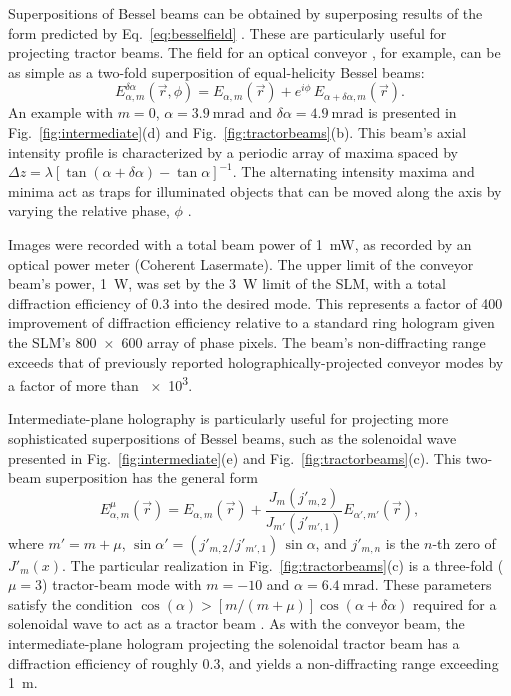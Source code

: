 Superpositions of Bessel beams can be obtained
by superposing results of the form predicted
by Eq.~\eqref{eq:besselfield} \cite{mcgloin03b}.
These are particularly useful for projecting
tractor beams.
The field for an optical conveyor
\cite{cizmar05,ruffner12a,ruffner14},
for example, can be as simple as a two-fold superposition
of equal-helicity Bessel beams:
\begin{equation}
  \label{eq:conveyorfield}
  E_{\alpha,m}^{\delta \alpha}(\vec{r},\phi)
  =
  E_{\alpha,m}(\vec{r})
  +
  e^{i \phi} \,
  E_{\alpha+\delta\alpha,m}(\vec{r}).
\end{equation}
An example with $m = 0$, $\alpha = \SI{3.9}{\milli\radian}$
and $\delta \alpha = \SI{4.9}{\milli\radian}$
is presented in Fig.~\ref{fig:intermediate}(d) and Fig.~\ref{fig:tractorbeams}(b).
This beam's axial intensity profile is characterized by
a periodic array of maxima spaced by
$\Delta z = \lambda [\tan (\alpha + \delta\alpha) - \tan
\alpha]^{-1}$.
The alternating intensity maxima and minima act as
traps for illuminated objects that can be moved
along the axis by
varying the relative phase, $\phi$
\cite{cizmar05,ruffner12a,ruffner14}.

Images were recorded with a total beam power of \SI{1}{\milli\watt},
as recorded by an optical power meter (Coherent Lasermate).
The upper limit of the conveyor beam's power, \SI{1}{\watt}, was
set by the \SI{3}{\watt} limit of the SLM, with a total diffraction
efficiency of \num{0.3} into the desired mode.
This represents a factor of \num{400} improvement of diffraction
efficiency relative to a standard ring hologram
\cite{ruffner12a,ruffner14}
given the SLM's \num{800 x 600} array of phase pixels.
The beam's non-diffracting range exceeds that of previously
reported holographically-projected conveyor modes
\cite{ruffner12a,ruffner14}
by a factor of more than \num{e3}.

Intermediate-plane holography is particularly useful for projecting
more sophisticated superpositions of Bessel beams, such
as the solenoidal wave presented in Fig.~\ref{fig:intermediate}(e) and
Fig.~\ref{fig:tractorbeams}(c).
This two-beam superposition has the general form
\begin{equation}
  \label{eq:solenoid}
  E_{\alpha,m}^{\mu}(\vec{r})
  =
  E_{\alpha,m}(\vec{r})
  +
  \frac{J_m(j'_{m,2})}{J_{m'}(j'_{m',1})}
  E_{\alpha',m'}(\vec{r}),
\end{equation}
where $m' = m + \mu$,
$\sin\alpha' = (j'_{m,2}/j'_{m',1}) \, \sin\alpha$, and
$j'_{m,n}$ is the $n$-th zero of $J'_m(x)$.
The particular realization in Fig.~\ref{fig:tractorbeams}(c)
is a three-fold ($\mu = 3$) tractor-beam mode \cite{yevick16}
with $m = -10$ and $\alpha = \SI{6.4}{\milli\radian}$.
These parameters satisfy the condition
$\cos(\alpha) > [m/(m + \mu)] \cos(\alpha + \delta \alpha)$
required for a solenoidal wave to act as a tractor beam
\cite{yevick16}.
As with the conveyor beam, the intermediate-plane hologram
projecting the solenoidal tractor beam has a diffraction
efficiency of roughly \num{0.3}, and yields a non-diffracting
range exceeding \SI{1}{\meter}.

